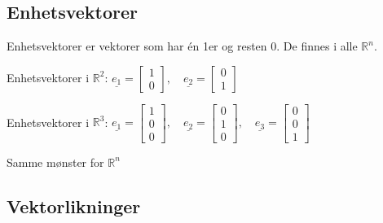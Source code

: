 \documentclass[11pt, a4paper, norsk]{article}
\begin{document}
        \subsection{Enhetsvektorer}%
        \label{sub:enhetsvektorer}
        
        Enhetsvektorer er vektorer som har én 1er og resten 0. De finnes i alle $\mathbb{R}^n$.
       
        Enhetsvektorer i $\mathbb{R}^2$:
        $\underline{e_1} = \begin{bmatrix}
            1 \\
            0
        \end{bmatrix}, \quad \underline{e_2} = \begin{bmatrix}
            0 \\
            1
        \end{bmatrix}$

        Enhetsvektorer i $\mathbb{R}^3$:
        $\underline{e_1} = \begin{bmatrix}
            1 \\
            0 \\ 
            0
        \end{bmatrix}, \quad \underline{e_2} = \begin{bmatrix}
            0 \\
            1 \\ 
            0
        \end{bmatrix}, \quad \underline{e_3} = \begin{bmatrix}
            0 \\
            0 \\
            1
        \end{bmatrix}$

        Samme mønster for $\mathbb{R}^n$

        \subsection{Vektorlikninger}%
        \label{sub:vektorlikninger}
        
\end{document}
